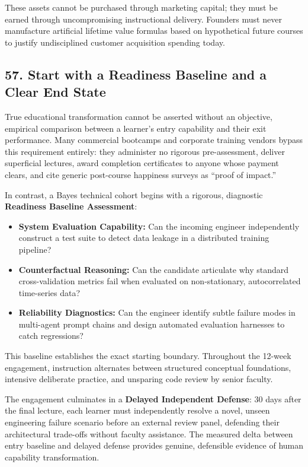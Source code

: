 These assets cannot be purchased through marketing capital; they must be earned through uncompromising instructional delivery. Founders must never manufacture artificial lifetime value formulas based on hypothetical future courses to justify undisciplined customer acquisition spending today.

\subsection*{57. Start with a Readiness Baseline and a Clear End State}

True educational transformation cannot be asserted without an objective, empirical comparison between a learner's entry capability and their exit performance. Many commercial bootcamps and corporate training vendors bypass this requirement entirely: they administer no rigorous pre-assessment, deliver superficial lectures, award completion certificates to anyone whose payment clears, and cite generic post-course happiness surveys as ``proof of impact.''

In contrast, a Bayes technical cohort begins with a rigorous, diagnostic \textbf{Readiness Baseline Assessment}:
\begin{itemize}[leftmargin=*]
\item \textbf{System Evaluation Capability:} Can the incoming engineer independently construct a test suite to detect data leakage in a distributed training pipeline?
\item \textbf{Counterfactual Reasoning:} Can the candidate articulate why standard cross-validation metrics fail when evaluated on non-stationary, autocorrelated time-series data?
\item \textbf{Reliability Diagnostics:} Can the engineer identify subtle failure modes in multi-agent prompt chains and design automated evaluation harnesses to catch regressions?
\end{itemize}

This baseline establishes the exact starting boundary. Throughout the 12-week engagement, instruction alternates between structured conceptual foundations, intensive deliberate practice, and unsparing code review by senior faculty. 

The engagement culminates in a \textbf{Delayed Independent Defense}: 30 days after the final lecture, each learner must independently resolve a novel, unseen engineering failure scenario before an external review panel, defending their architectural trade-offs without faculty assistance. The measured delta between entry baseline and delayed defense provides genuine, defensible evidence of human capability transformation.

